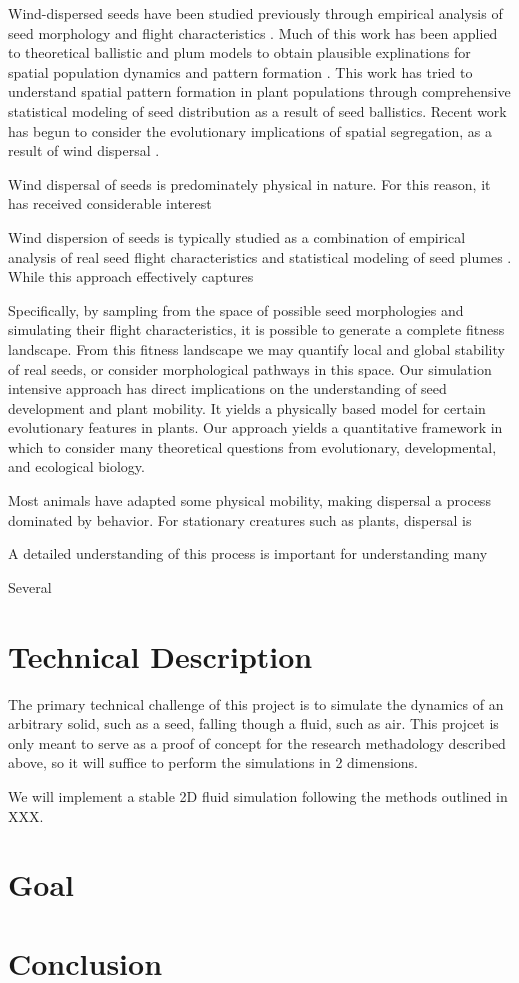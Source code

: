 \documentclass[annual]{acmsiggraph}
\begin{document}
Wind-dispersed seeds have been studied previously through empirical analysis of seed morphology and flight characteristics \cite{augspurger1986}.  Much of this work has been applied to  theoretical ballistic and plum models  to obtain plausible explinations for spatial population dynamics and pattern formation \cite{levin2003}.  This work has tried to understand spatial pattern formation in plant populations through comprehensive statistical modeling of seed distribution as a result of seed ballistics.  Recent work has begun to consider  the evolutionary implications of spatial segregation, as a result of wind dispersal \cite{Cheptou2008} \cite{levin2010}.  




Wind dispersal of seeds is predominately physical in nature.    For this reason, it has received considerable interest 




Wind dispersion of seeds is typically studied as a combination of empirical analysis of real seed flight characteristics and statistical modeling of seed plumes   .  While this approach effectively captures 


 Specifically, by sampling from the space of possible seed morphologies and simulating their flight characteristics, it is possible to generate a complete fitness landscape.  From this fitness landscape we may quantify local and global stability of real seeds, or consider morphological pathways in this space.  Our simulation intensive approach has direct implications on the understanding of seed development and plant mobility.  It yields a physically based model for certain evolutionary features in plants.   Our approach yields a quantitative framework in which to consider many theoretical questions from evolutionary, developmental, and ecological biology.  


Most animals have adapted some physical mobility, making dispersal a process dominated by behavior.  For stationary creatures such as plants, dispersal is  


A detailed understanding of this process is important for understanding many 



\cite{wang2012}
\cite{levin1989}

Several 



\section{Technical Description}
The primary technical challenge of this project is to simulate the dynamics of an arbitrary solid, such as a seed, falling though a fluid, such as air.  This projcet is only meant to serve as a proof of concept for the research methadology described above, so it will suffice to perform the simulations in 2 dimensions.   

We will implement a stable 2D fluid simulation following the methods outlined in XXX.   



\section{Goal}

\section{Conclusion}



\end{document}
